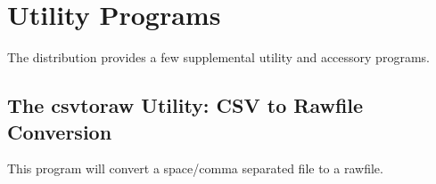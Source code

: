 
\chapter{Utility Programs}


The {\WRspice} distribution provides a few supplemental utility
and accessory programs.

\section{The {\vt csvtoraw} Utility: CSV to Rawfile Conversion}


This program will convert a space/comma separated file to a rawfile.

